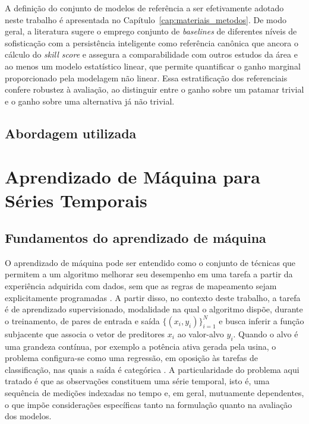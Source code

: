 A definição do conjunto de modelos de referência a ser efetivamente adotado neste trabalho
é apresentada no Capítulo~\ref{cap:materiais_metodos}. De modo geral, a literatura sugere o
emprego conjunto de \emph{baselines} de diferentes níveis de sofisticação com a persistência
inteligente como referência canônica que ancora o cálculo do \emph{skill score} e
assegura a comparabilidade com outros estudos da área e ao menos um modelo estatístico
linear, que permite quantificar o ganho marginal proporcionado pela modelagem não linear.
Essa estratificação dos referenciais confere robustez à avaliação, ao distinguir entre o
ganho sobre um patamar trivial e o ganho sobre uma alternativa já não trivial.

\subsection{Abordagem utilizada}
\label{subsec:abordagem_utilizada}


\section{Aprendizado de Máquina para Séries Temporais}
\label{sec:ml_series_temporais}

\subsection{Fundamentos do aprendizado de máquina}
\label{subsec:fundamentos_ml}

O aprendizado de máquina pode ser entendido como o conjunto de técnicas que
permitem a um algoritmo melhorar seu desempenho em uma tarefa a partir da
experiência adquirida com dados, sem que as regras de mapeamento sejam
explicitamente programadas \cite{hastie2009}. A partir disso, no contexto deste trabalho, a
tarefa é de aprendizado supervisionado, modalidade na qual o algoritmo dispõe,
durante o treinamento, de pares de entrada e saída $\{(x_i, y_i)\}_{i=1}^{N}$ e
busca inferir a função subjacente que associa o vetor de preditores $x_i$ ao
valor-alvo $y_i$. Quando o alvo é uma grandeza contínua, por exemplo a potência
ativa gerada pela usina, o problema configura-se como uma regressão, em
oposição às tarefas de classificação, nas quais a saída é categórica
\cite{bishop2006}. A particularidade do problema aqui tratado é que as
observações constituem uma série temporal, isto é, uma sequência de medições
indexadas no tempo e, em geral, mutuamente dependentes, o que impõe
considerações específicas tanto na formulação quanto na avaliação dos modelos.

